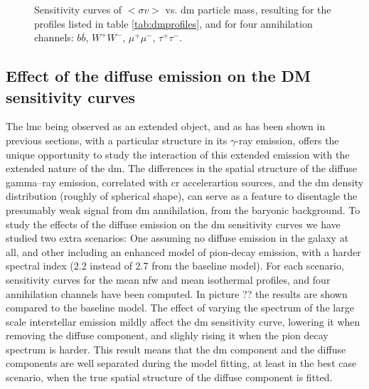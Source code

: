 \documentclass[main.tex]{subfiles}
\begin{document}
\begin{figure}[h]
\endminipage
  \caption{Sensitivity curves of $<\sigma v >$ vs. \gls{dm} particle mass, resulting for the profiles listed in table \ref{tab:dmprofiles}, and for four annihilation channels: $b\overline b$, $W^+W^-$, $\mu^+ \mu^-$, $\tau^+ \tau^-$.}
    \label{fig:dmsensicurves}
\end{figure}

\subsection{Effect of the diffuse emission on the DM sensitivity curves}  \label{sec:dm:diff}

The \gls{lmc} being observed as an extended object, and as has been shown in previous sections, with a particular structure in its $\gamma$-ray emission, offers the unique opportunity to study the interaction of this extended emission with the extended nature of the \gls{dm}. The differences in the spatial structure of the diffuse gamma--ray emission, correlated with \gls{cr} accelerartion sources, and the \gls{dm} density distribution (roughly of spherical shape), can serve as a feature to disentagle the presumably weak signal from \gls{dm} annihilation, from the baryonic background. To study the effects of the diffuse emission on the \gls{dm} sensitivity curves we have studied two extra scenarios: One assuming no diffuse emission in the galaxy at all, and other including an enhanced model of pion-decay emission, with a harder spectral index (2.2 instead of 2.7 from the baseline model). For each scenario, sensitivity curves for the mean \gls{nfw} and mean isothermal profiles, and four annihilation channels have been computed. In picture ?? the results are shown compared to the baseline model. The effect of varying the spectrum of the large scale interstellar emission mildly affect the \gls{dm} sensitivity curve, lowering it when removing the diffuse component, and slighly rising it when the pion decay spectrum is harder. This result means that the \gls{dm} component and the diffuse components are well separated during the model fitting, at least in the best case scenario, when the true spatial structure of the diffuse component is fitted. 
\end{document}

